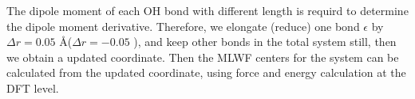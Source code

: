 %        
%
The dipole moment of each OH bond with different length is requird to determine the dipole moment derivative. 
Therefore, we elongate (reduce) one bond ${\epsilon}$ by $\Delta r = 0.05$ \AA ($\Delta r = -0.05 $ \A), and keep other 
bonds in the total system still, then we obtain a updated coordinate.
Then the MLWF centers for the system can be calculated from the updated coordinate, using force and energy calculation at the DFT level.
